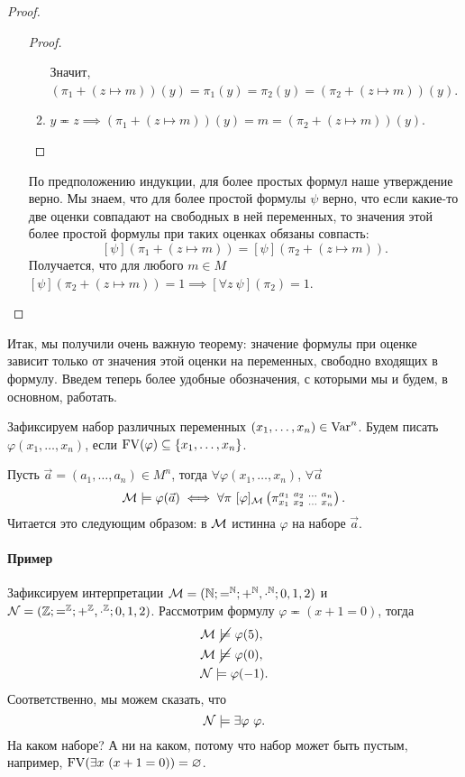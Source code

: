 \begin{proof}
\begin{enumerate}
\begin{proof}
\begin{enumerate}
                Значит, $(\pi_{1} + (z \mapsto m))(y) = \pi_{1}(y) = \pi_{2}(y) = (\pi_{2} + (z \mapsto m))(y)$.
                \item $y \eqcirc z \implies (\pi_{1} + (z \mapsto m))(y) = m = (\pi_{2} + (z \mapsto m))(y)$. \qedhere
            \end{enumerate}
        \end{proof}
        По предположению индукции, для более простых формул наше утверждение верно.
        Мы знаем, что для более простой формулы $\psi$ верно, что если какие-то две оценки совпадают на свободных в ней переменных, то значения этой более простой формулы при таких оценках обязаны совпасть:
        $$
            [\psi](\pi_{1} + (z \mapsto m)) = [\psi](\pi_{2} + (z \mapsto m)).
        $$
        Получается, что для любого $m \in M$ $[\psi](\pi_{2} + (z \mapsto m)) = 1 \implies [\forall z~\psi](\pi_{2}) = 1$. \qedhere
    \end{enumerate}
\end{proof}

Итак, мы получили очень важную теорему: значение формулы при оценке зависит только от значения этой оценки на переменных, свободно входящих в формулу.
Введем теперь более удобные обозначения, с которыми мы и будем, в основном, работать.

\begin{notation*}
    Зафиксируем набор различных переменных $(x_{1}, \ldots, x_{n}) \in \mathrm{Var}^{n}$.
    Будем писать $\varphi(x_{1}, \ldots, x_{n})$, если $\mathrm{FV}(\varphi) \subseteq \{x_{1}, \ldots, x_{n}\}$.
\end{notation*}

\begin{notation*}
    Пусть $\vec{a} = (a_{1}, \ldots, a_{n}) \in M^{n}$, тогда $\forall \varphi(x_{1}, \ldots, x_{n})$, $\forall \vec{a}$
    $$
        \mathcal{M} \models \varphi(\vec{a}) \iff \forall\pi~[\varphi]_{\mathcal{M}}\left(\pi_{x_{1}~x_{2}~\ldots~x_{n}}^{a_{1}~a_{2}~\ldots~a_{n}}\right).
    $$
    Читается это следующим образом: в $\mathcal{M}$ истинна $\varphi$ на наборе $\vec{a}$.
\end{notation*}

\paragraph{Пример}
Зафиксируем интерпретации $\mathcal{M} = (\mathbb{N}; =^{\mathbb{N}}; +^{\mathbb{N}}, \cdot^{\mathbb{N}}; 0, 1, 2)$ и $\mathcal{N} = (\mathbb{Z}; =^{\mathbb{Z}}; +^{\mathbb{Z}}, \cdot^{\mathbb{Z}}; 0, 1, 2)$.
Рассмотрим формулу $\varphi \eqcirc (x + 1 = 0)$, тогда
\begin{align}
    &\mathcal{M} ~\cancel{\models}~ \varphi(5), \\
    &\mathcal{M} ~\cancel{\models}~ \varphi(0), \\
    &\mathcal{N} \models \varphi(-1).
\end{align}
Соответственно, мы можем сказать, что
$$
    \mathcal{N} \models \exists \varphi~\varphi.
$$
На каком наборе?
А ни на каком, потому что набор может быть пустым, например, $\mathrm{FV}(\exists x~ (x + 1 = 0)) = \varnothing$.

